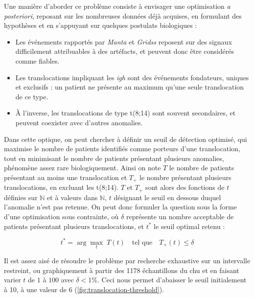 Une manière d'aborder ce problème consiste à envisager une optimisation
\textit{a posteriori}, reposant sur les nombreuses données déjà acquises, en
formulant des hypothèses et en s'appuyant sur quelques postulats biologiques :

\begin{itemize}
    \item Les événements rapportés par \textit{Manta} et \textit{Gridss}
          reposent sur des signaux difficilement attribuables à des artéfacts,
          et peuvent donc être considérés comme fiables.
    \item Les translocations impliquant les \textit{\gls{igh}} sont des
          événements fondateurs, uniques et exclusifs : un patient ne présente
          au maximum qu'une seule translocation de ce type.
    \item À l'inverse, les translocations de type t(8;14) sont souvent
          secondaires, et peuvent coexister avec d'autres anomalies.
\end{itemize}

\vspace{1em}

Dans cette optique, on peut chercher à définir un seuil de détection optimisé,
qui maximise le nombre de patients identifiés comme porteurs d'une
translocation, tout en minimisant le nombre de patients présentant plusieurs
anomalies, phénomène assez rare biologiquement. Ainsi on note $T$ le nombre de
patients présentant au moins une translocation et $T_{+}$ le nombre présentant
plusieurs translocations, en excluant les t(8;14). $T$ et $T_{+}$ sont alors
des fonctions de $t$ définies sur $\mathbb{N}$ et à valeurs dans $\mathbb{N}$,
$t$ désignant le seuil en dessous duquel l'anomalie n'est pas retenue. On peut
donc formuler la question sous la forme d'une optimisation sous contrainte, où
$\delta$ représente un nombre acceptable de patients présentant plusieurs
translocations, et $t^*$ le seuil optimal retenu :

\begin{equation}
    t^* = \arg\max_{t} \; T(t) \quad \text{tel que} \quad T_{+}(t) \leq \delta
\end{equation}

Il est assez aisé de résoudre le problème par recherche exhaustive sur un
intervalle restreint, ou graphiquement à partir des 1178 échantillons du
\gls{chu} et en faisant varier $t$ de $1$ à $100$ avec $\delta < 1 \%$. Ceci
nous permet d'abaisser le seuil initialement à 10, à une valeur de 6
(\autoref{fig:translocation-threshold}).

